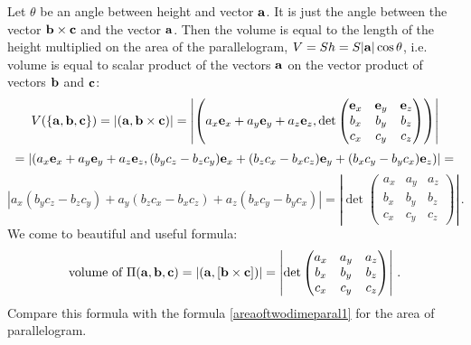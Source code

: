 \documentclass[12pt]{article}
\numberwithin{equation}{section}
\begin{document}
Let $\theta$ be an angle between height and vector ${\bf a}$.
It is just the angle between the vector ${\bf b}\times{\bf c}$ and the vector ${\bf a}$.
Then the
volume is equal to the length  of the height multiplied on the area of the parallelogram,
$V=Sh=S|{\bf a}|\cos\theta$, i.e.
volume  is equal to scalar product of the vectors ${\bf a}$ on the vector product of vectors ${\bf b}$ and ${\bf c}$:
\begin{equation*}\label{volumeofparallelepiped}
    V(\{{\bf a},{\bf b},{\bf c}\})=\left|\left({\bf a},{\bf b}\times {\bf c}\right)\right|=
             \left|
    \left(a_x{\bf e}_x+a_y{\bf e}_y+a_z{\bf e}_z, \det
                \begin{pmatrix}
                {\bf e}_x  &{\bf e}_y  &{\bf e}_z \\
                  b_x   & b_y  &b_z \\
                  c_x   & c_y  &c_z
                  \end{pmatrix}
                     \right)
                \right|
\end{equation*}
             $$
= \left|
  \left(a_x{\bf e}_x+a_y{\bf e}_y+a_z{\bf e}_z,  
(b_yc_z-b_zc_y){\bf e}_x+(b_zc_x-b_xc_z){\bf e}_y+(b_xc_y-b_yc_x){\bf e}_z\right)
            \right|=
             $$
             $$
    \left| 
    a_x(b_yc_z-b_zc_y)+a_y(b_zc_x-b_xc_z)+a_z(b_xc_y-b_yc_x)\right|
             =
                   \left|
                   \det
      \begin{pmatrix}
                a_x  &a_y  &a_z \\
                  b_x   & b_y  &b_z \\
                  c_x   & c_y  &c_z
                  \end{pmatrix}
             \right|\,.
             $$
We come to beautiful and  useful formula:
 \begin{equation}\label{mixedproduct}
       \hbox{volume of $\Pi({\bf a},{\bf b},{\bf c})$}=
        \left|
\left({\bf a},\left[{\bf b}\times {\bf c}\right]\right)
        \right|
                     =
                \left|
                     \det
                    \begin{pmatrix}
                a_x  &a_y  &a_z \\
                  b_x   & b_y  &b_z \\
                  c_x   & c_y  &c_z
                  \end{pmatrix}
                 \right|\,.
\end{equation}
Compare this formula with the formula \eqref{areaoftwodimeparal1} 
for the area of parallelogram.
\end{document}
